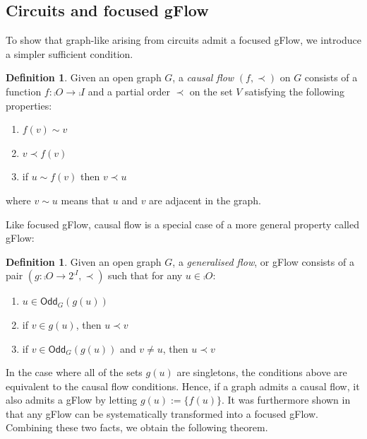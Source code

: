 \documentclass[a4paper,onecolumn,superscriptaddress,11pt,accepted=2020-04-27]{quantumarticle}
\newcommand{\odd}[2]{\textsf{Odd}_{#1}\left(#2\right)}
\theoremstyle{definition}
\newtheorem{definition}[theorem]{Definition}
\begin{document}

\subsection{Circuits and focused gFlow}
\label{sec:circuits-causal-flow}


To show that graph-like \zxdiagrams arising from circuits admit a focused gFlow, we introduce a simpler sufficient condition.

\begin{definition}{\cite{Danos2006Determinism-in-}}\label{def:causal-flow}
Given an open graph $G$, a
\emph{causal flow} $(f,\prec)$ on $G$  consists of a
function $f: \comp O \to \comp I$ and a partial order $\prec$ on the set
$V$ satisfying the following properties:
\begin{enumerate}%
\item $f(v) \sim v$ \label{flowi}
\item $v \prec f(v)$ \label{flowii}
\item if $u \sim f(v)$ then $v \prec u$ \label{flowiii}
\end{enumerate}
where $v \sim u$ means that $u$ and $v$ are adjacent in the graph.
\end{definition}

Like focused gFlow, causal flow is a special case of a more general property called gFlow:

\begin{definition}
Given an open graph $G$, a \textit{generalised flow}, or gFlow consists of a pair $(g : \comp O \to 2^{\comp I},\prec)$ such that for any $u \in \comp O$:
\begin{enumerate}
\item $u \in \odd{G}{g(u)}$
\item if $v \in g(u)$, then $u \prec v$
\item if $v \in \odd{G}{g(u)}$ and $v \neq u$, then $u \prec v$
\end{enumerate}
\end{definition}

In the case where all of the sets $g(u)$ are singletons, the conditions above are equivalent to the causal flow conditions. Hence, if a graph admits a causal flow, it also admits a gFlow by letting $g(u) := \{ f(u) \}$. It was furthermore shown in \cite{mhalla2011graph} that any gFlow can be systematically transformed into a focused gFlow. Combining these two facts, we obtain the following theorem.
\end{document}
